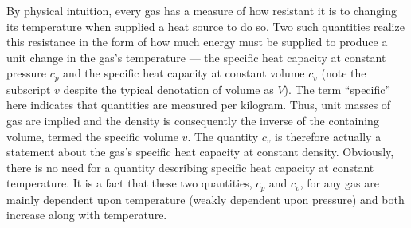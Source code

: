 \documentclass[11pt,dvipsnames]{thesis}
\begin{document}
By physical intuition, every gas has a measure of how resistant it is to changing its temperature when supplied a heat source to do so. Two such quantities realize this resistance in the form of how much energy must be supplied to produce a unit change in the gas's temperature --- the specific heat capacity at constant pressure $c_p$ and the specific heat capacity at constant volume $c_v$ (note the subscript $v$ despite the typical denotation of volume as $V$). 
The term ``specific'' here indicates that quantities are measured per kilogram. Thus, unit masses of gas are implied and the density is consequently the inverse of the containing volume, termed the specific volume $v$.
The quantity $c_v$ is therefore actually a statement about the gas's specific heat capacity at constant density.
Obviously, there is no need for a quantity describing specific heat capacity at constant temperature.
It is a fact that these two quantities, $c_p$ and $c_v$, for any gas are mainly dependent upon temperature (weakly dependent upon pressure) and both increase along with temperature.
\end{document}
